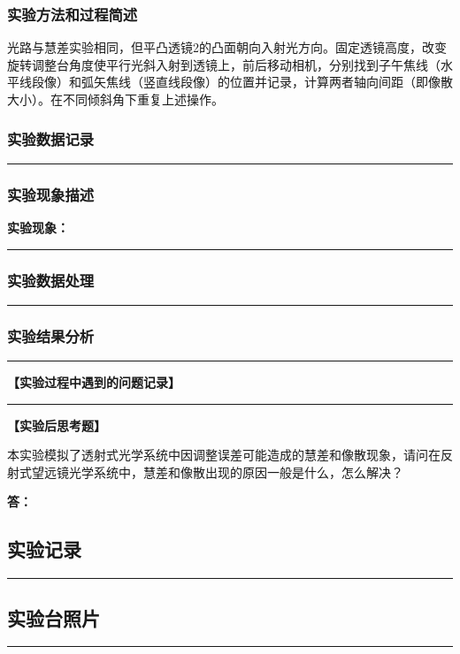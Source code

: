 \documentclass[dvipsnames, svgnames,a4paper,11pt]{article}
\newcommand{\answerblank}[1][3.8cm]{%
  \par\nopagebreak[4]\noindent\textbf{答：}\par\nopagebreak[4]\vspace*{#1}}
\newcommand{\recordblank}[1]{%
  \par\noindent\rule{0.95\linewidth}{0pt}\rule{0pt}{#1}\par}
\begin{document}
\subsubsection{实验方法和过程简述}

光路与慧差实验相同，但平凸透镜2的凸面朝向入射光方向。固定透镜高度，改变旋转调整台角度使平行光斜入射到透镜上，前后移动相机，分别找到子午焦线（水平线段像）和弧矢焦线（竖直线段像）的位置并记录，计算两者轴向间距（即像散大小）。在不同倾斜角下重复上述操作。

\subsubsection{实验数据记录}
\recordblank{5.5cm}
\subsubsection{实验现象描述}
\noindent\textbf{实验现象：}\par
\recordblank{4.5cm}
\subsubsection{实验数据处理}
\recordblank{5.5cm}
\subsubsection{实验结果分析}
\recordblank{5.5cm}
\textbf{【实验过程中遇到的问题记录】}
\recordblank{5cm}
\clearpage

\textbf{【实验后思考题】}

\begin{question}
	本实验模拟了透射式光学系统中因调整误差可能造成的慧差和像散现象，请问在反射式望远镜光学系统中，慧差和像散出现的原因一般是什么，怎么解决？
\end{question}
\answerblank[3.8cm]
\clearpage

\appendix
\appendixpage
\addappheadtotoc

\subsection{实验记录}
\recordblank{5.5cm}
\subsection{实验台照片}
\recordblank{5.5cm}
\end{document}
